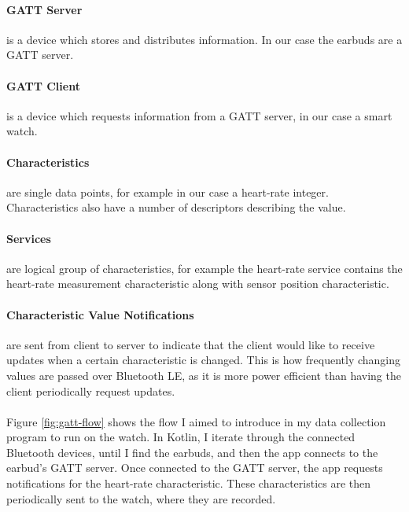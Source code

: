 \documentclass[12pt,a4paper,twoside,openany]{report}
\begin{document}
\paragraph{GATT Server} is a device which stores and distributes information. In
our case the earbuds are a GATT server.

\paragraph{GATT Client} is a device which requests information from a GATT
server, in our case a smart watch.

\paragraph{Characteristics} are single data points, for example in our case a
heart-rate integer. Characteristics also have a number of descriptors
describing the value.

\paragraph{Services} are logical group of characteristics, for example the
heart-rate service contains the heart-rate measurement characteristic along
with sensor position characteristic.

\paragraph{Characteristic Value Notifications} are sent from client to server
to indicate that the client would like to receive updates when a certain
characteristic is changed. This is how frequently changing values are passed
over Bluetooth LE, as it is more power efficient than having the client
periodically request updates.
\\
\\

Figure \ref{fig:gatt-flow} shows the flow I aimed to introduce in my data collection program to run
on the watch. In Kotlin, I iterate through the connected Bluetooth devices,
until I find the earbuds, and then the app connects to the earbud's GATT
server. Once connected 
to the GATT server, the app
requests notifications for the heart-rate characteristic. These
characteristics are then periodically sent to the watch, where they are
recorded.
\end{document}
